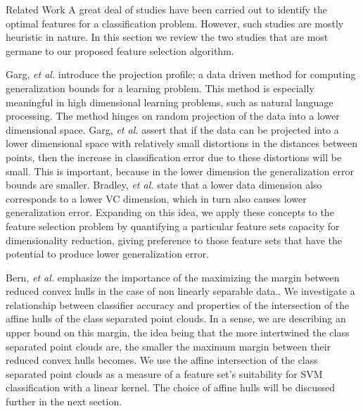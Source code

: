 \documentclass{llncs}
\begin{document}
\begin{section}{Related Work}
A great deal of studies have been carried out to identify the optimal features for a classification problem\cite{Molina}\cite{Joachims}. However, such studies are mostly heuristic in nature. In this section we review the two studies that are most germane to our proposed feature selection algorithm.

Garg, {\it et al.} introduce the projection profile; a data driven method for computing generalization bounds for a learning problem\cite{Garg}. This method is especially meaningful in high dimensional learning problems, such as natural language processing\cite{Garg}. The method hinges on random projection of the data into a lower dimensional space. Garg, {\it et al.} assert that if the data can be projected into a lower dimensional space with relatively small distortions in the distances between points, then the increase in classification error due to these distortions will be small\cite{Garg}. This is important, because in the lower dimension the generalization error bounds are smaller. Bradley, {\it et al.}\cite{Bradley} state that a lower data dimension also corresponds to a lower VC dimension, which in turn also causes lower generalization error\cite{Vapnik}. Expanding on this idea, we apply these concepts to the feature selection problem by quantifying a particular feature sets capacity for dimensionality reduction, giving preference to those feature sets that have the potential to produce lower generalization error.

Bern, {\it et al.} emphasize the importance of the maximizing the margin between reduced convex hulls in the case of non linearly separable data.\cite{Bern}. We investigate a relationship between classifier accuracy and properties of the intersection of the affine hulls of the class separated point clouds. In a sense, we are describing an upper bound on this margin, the idea being that the more intertwined the class separated point clouds are, the smaller the maximum margin between their reduced convex hulls becomes. We use the affine intersection of the class separated point clouds as a measure of a feature set's suitability for SVM classification with a linear kernel. The choice of affine hulls will be discussed further in the next section.
\end{section}
\end{document}

